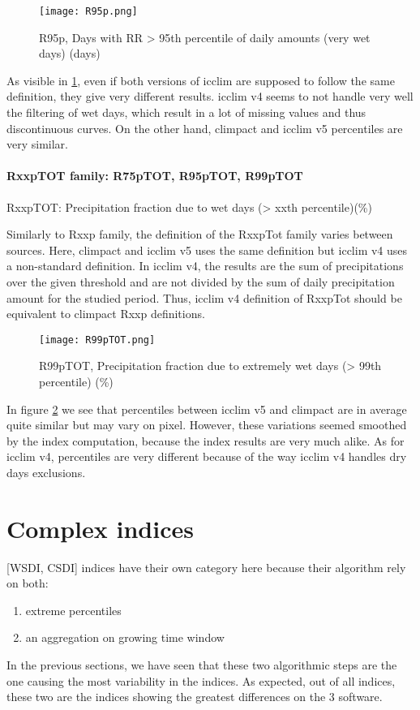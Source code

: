 \documentclass[a4paper,11pt]{article}
\begin{document}
            \begin{figure}
                \centering
                \texttt{[image: R95p.png]}
                \caption{R95p, Days with RR > 95th percentile of daily amounts (very wet days) (days)}
                \label{figure/r95p}
            \end{figure}

            As visible in \ref{figure/r95p}, even if both versions of icclim are supposed to follow the same definition, they give very different results.
            icclim v4 seems to not handle very well the filtering of wet days, which result in a lot of missing values and thus discontinuous curves.
            On the other hand, climpact and icclim v5 percentiles are very similar.

        \subsection{RxxpTOT family: R75pTOT, R95pTOT, R99pTOT}
        RxxpTOT: Precipitation fraction due to wet days (> xxth percentile)(\%)

        Similarly to Rxxp family, the definition of the RxxpTot family varies between sources. 
        Here, climpact and icclim v5 uses the same definition but icclim v4 uses a non-standard definition. 
        In icclim v4, the results are the sum of precipitations over the given threshold and are not divided by the sum of daily precipitation amount for the studied period. 
        Thus, icclim v4 definition of RxxpTot should be equivalent to climpact Rxxp definitions.

        \begin{figure}
            \centering
            \texttt{[image: R99pTOT.png]}
            \caption{R99pTOT, Precipitation fraction due to extremely wet days (> 99th percentile) (\%)}
            \label{figure/r99ptot}
        \end{figure}

        In figure \ref{figure/r99ptot} we see that percentiles between icclim v5 and climpact are in average quite similar but may vary on pixel.
        However, these variations seemed smoothed by the index computation, because the index results are very much alike.
        As for icclim v4, percentiles are very different because of the way icclim v4 handles dry days exclusions. 


\part{Complex indices}
\label{part/complex_indices}
    [WSDI, CSDI] indices have their own category here because their algorithm rely on both:
    \begin{enumerate}
        \item extreme percentiles
        \item an aggregation on growing time window
    \end{enumerate}
    In the previous sections, we have seen that these two algorithmic steps are the one causing the most variability in the indices.
    As expected, out of all indices, these two are the indices showing the greatest differences on the 3 software.
\end{document}
